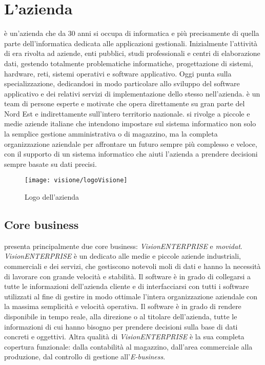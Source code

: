 \section{L'azienda}

\visione{} è un'azienda che da 30 anni si occupa di informatica e più precisamente di quella parte dell'informatica dedicata alle applicazioni gestionali. Inizialmente l'attività di \visione{} era rivolta ad aziende, enti pubblici, studi professionali e centri di elaborazione dati, gestendo totalmente problematiche informatiche, progettazione di sistemi, hardware, reti, sistemi operativi e software applicativo. Oggi \visione{} punta sulla specializzazione, dedicandosi in modo particolare allo sviluppo del software applicativo e dei relativi servizi di implementazione dello stesso nell'azienda. \visione{} è un team di persone esperte e motivate che opera direttamente su gran parte del Nord Est e indirettamente sull'intero territorio nazionale. \visione{} si rivolge a piccole e medie aziende italiane che intendono impostare sul sistema informatico non solo la semplice gestione amministrativa o di magazzino, ma la completa organizzazione aziendale per affrontare un futuro sempre più complesso e veloce, con il supporto di un sistema informatico che aiuti l'azienda a prendere decisioni sempre basate su dati precisi.

\begin{figure}[!h] 
    \centering 
    \texttt{[image: visione/logoVisione]} 
    \caption{Logo dell'azienda \visione{}}
\end{figure}

\subsection{Core business}

\visione{} presenta principalmente due core business: \textit{VisionENTERPRISE} e \textit{movidat}. \textit{VisionENTERPRISE} è un   dedicato alle medie e piccole aziende industriali, commerciali e dei servizi, che gestiscono notevoli moli di dati e hanno la necessità di lavorare con grande velocità e stabilità. Il software è in grado di collegarsi a tutte le informazioni dell'azienda cliente e di interfacciarsi con tutti i software utilizzati al fine di gestire in modo ottimale l'intera organizzazione aziendale con la massima semplicità e velocità operativa. Il software è in grado di rendere disponibile in tempo reale, alla direzione o al titolare dell'azienda, tutte le informazioni di cui hanno bisogno per prendere decisioni sulla base di dati concreti e oggettivi. Altra qualità di \textit{VisionENTERPRISE} è la sua completa copertura funzionale: dalla contabilità al magazzino, dall'area commerciale alla produzione, dal controllo di gestione all'\textit{E-business}.

